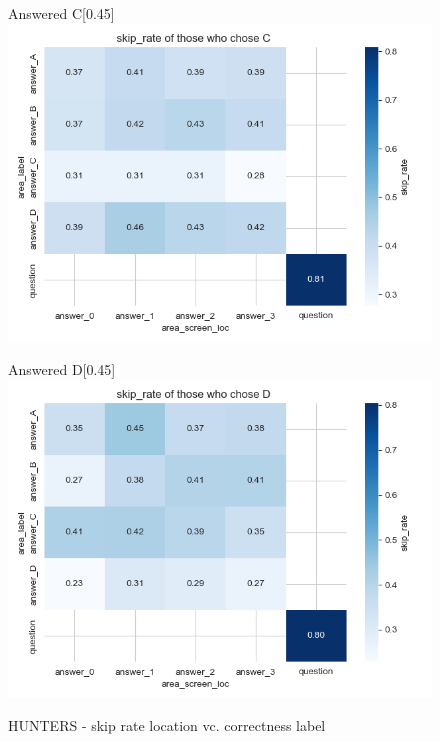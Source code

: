 \documentclass{article}
\begin{document}
\begin{figure}[H]
  \vspace{1em} %

  \begin{subcaptionbox}{Answered C\label{fig:C_sr_h}}[0.45\textwidth]
    {\centering\includegraphics[width=\linewidth]{plots/matrix_plots/matrix_skip_rate_C_hunters.png}}
  \end{subcaptionbox}
  \hfill
  \begin{subcaptionbox}{Answered D\label{fig:D_sr_h}}[0.45\textwidth]
    {\centering\includegraphics[width=\linewidth]{plots/matrix_plots/matrix_skip_rate_D_hunters.png}}
  \end{subcaptionbox}
  
  \caption{HUNTERS - skip rate location vc. correctness label}
  \label{fig:fourimages9}
\end{figure}
\end{document}
